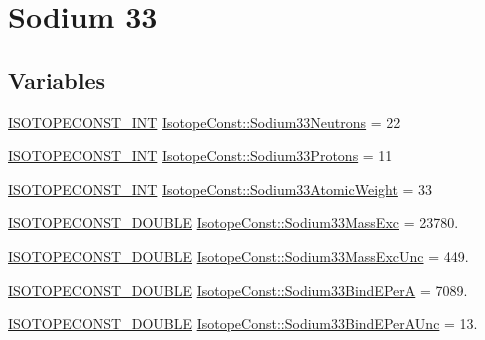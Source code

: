 \hypertarget{group___isotope_const-_sodium-_na33}{}\section{Sodium 33}
\label{group___isotope_const-_sodium-_na33}
\subsection*{Variables}
\begin{DoxyCompactItemize}
\item 
\mbox{\hyperlink{group___isotope_const-_macros_ga5f18360b3e99483a35c32d789e62621c}{I\+S\+O\+T\+O\+P\+E\+C\+O\+N\+S\+T\+\_\+\+I\+NT}} \mbox{\hyperlink{group___isotope_const-_sodium-_na33_gaba3bf871bbc3e0149e76d9a8d4aab733}{Isotope\+Const\+::\+Sodium33\+Neutrons}} = 22
\item 
\mbox{\hyperlink{group___isotope_const-_macros_ga5f18360b3e99483a35c32d789e62621c}{I\+S\+O\+T\+O\+P\+E\+C\+O\+N\+S\+T\+\_\+\+I\+NT}} \mbox{\hyperlink{group___isotope_const-_sodium-_na33_ga53b22ed5619a64d61d093c8633f62336}{Isotope\+Const\+::\+Sodium33\+Protons}} = 11
\item 
\mbox{\hyperlink{group___isotope_const-_macros_ga5f18360b3e99483a35c32d789e62621c}{I\+S\+O\+T\+O\+P\+E\+C\+O\+N\+S\+T\+\_\+\+I\+NT}} \mbox{\hyperlink{group___isotope_const-_sodium-_na33_ga690d1d40e51186d5faa033a16bd65a75}{Isotope\+Const\+::\+Sodium33\+Atomic\+Weight}} = 33
\item 
\mbox{\hyperlink{group___isotope_const-_macros_ga8f45a7272ce02c0b4c65c44636ed719a}{I\+S\+O\+T\+O\+P\+E\+C\+O\+N\+S\+T\+\_\+\+D\+O\+U\+B\+LE}} \mbox{\hyperlink{group___isotope_const-_sodium-_na33_ga557082b27c355996ef398139b4805247}{Isotope\+Const\+::\+Sodium33\+Mass\+Exc}} = 23780.
\item 
\mbox{\hyperlink{group___isotope_const-_macros_ga8f45a7272ce02c0b4c65c44636ed719a}{I\+S\+O\+T\+O\+P\+E\+C\+O\+N\+S\+T\+\_\+\+D\+O\+U\+B\+LE}} \mbox{\hyperlink{group___isotope_const-_sodium-_na33_ga271fd7c8ce68456625e010b3bd67ccd2}{Isotope\+Const\+::\+Sodium33\+Mass\+Exc\+Unc}} = 449.
\item 
\mbox{\hyperlink{group___isotope_const-_macros_ga8f45a7272ce02c0b4c65c44636ed719a}{I\+S\+O\+T\+O\+P\+E\+C\+O\+N\+S\+T\+\_\+\+D\+O\+U\+B\+LE}} \mbox{\hyperlink{group___isotope_const-_sodium-_na33_gaaa0740ded57a08c3c105912612520bd7}{Isotope\+Const\+::\+Sodium33\+Bind\+E\+PerA}} = 7089.
\item 
\mbox{\hyperlink{group___isotope_const-_macros_ga8f45a7272ce02c0b4c65c44636ed719a}{I\+S\+O\+T\+O\+P\+E\+C\+O\+N\+S\+T\+\_\+\+D\+O\+U\+B\+LE}} \mbox{\hyperlink{group___isotope_const-_sodium-_na33_gaf513116d9ce2f61fe145ff3d299e3012}{Isotope\+Const\+::\+Sodium33\+Bind\+E\+Per\+A\+Unc}} = 13.

\end{DoxyCompactItemize}

